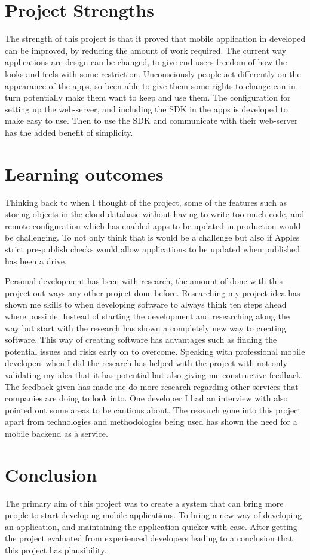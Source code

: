 \section{Project Strengths}

The strength of this project is that it proved that mobile application in developed can be improved, by reducing the amount of work required. The current way applications are design can be changed, to give end users freedom of how the looks and feels with some restriction. Unconsciously people act differently on the appearance of the apps, so been able to give them some rights to change can in-turn potentially make them want to keep and use them. The configuration for setting up the web-server, and including the SDK in the apps is developed to make easy to use. Then to use the SDK and communicate with their web-server has the added benefit of simplicity.

\section{Learning outcomes}

Thinking back to when I thought of the project, some of the features such as storing objects in the cloud database without having to write too much code, and remote configuration which has enabled apps to be updated in production would be challenging. To not only think that is would be a challenge but also if Apples strict pre-publish checks would allow applications to be updated when published has been a drive. 

Personal development has been with research, the amount of done with this project out ways any other project done before. Researching my project idea has shown me skills to when developing software to always think ten steps ahead where possible. Instead of starting the development and researching along the way but start with the research has shown a completely new way to creating software. This way of creating software has advantages such as finding the potential issues and risks early on to overcome.
Speaking with professional mobile developers when I did the research has helped with the project with not only validating my idea that it has potential but also giving me constructive feedback. The feedback given has made me do more research regarding other services that companies are doing to look into. One developer I had an interview with also pointed out some areas to be cautious about. The research gone into this project apart from technologies and methodologies being used has shown the need for a mobile backend as a service.

\section{Conclusion}
The primary aim of this project was to create a system that can bring more people to start developing mobile applications. To bring a new way of developing an application, and maintaining the application quicker with ease. After getting the project evaluated from experienced developers leading to a conclusion that this project has plausibility.